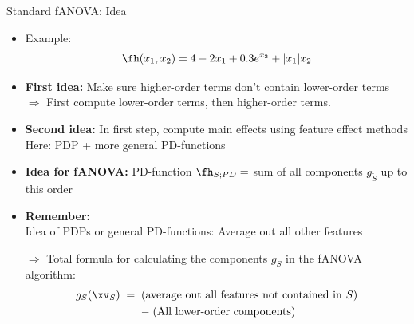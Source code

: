 \documentclass[11pt,compress,t,notes=noshow, aspectratio=169, xcolor=table]{beamer}
\begin{document}
\begin{frame}{Standard fANOVA: Idea}

    \begin{itemize}
        \item Example:
        \begin{equation*}
            \fh(x_1, x_2) = 4 - 2x_1 + 0.3 e^{x_2} + |x_1|x_2
        \end{equation*}
        \pause
        \item \textbf{First idea:} Make sure higher-order terms don't contain lower-order terms \\
        \(\Rightarrow\) First compute lower-order terms, then higher-order terms. \\
        \pause
        \item \textbf{Second idea:} In first step, compute main effects using feature effect methods \\
        Here: PDP + more general PD-functions
        \pause
        \item \textbf{Idea for fANOVA:} PD-function $\fh_{S;PD} =$ sum of all components $g_{\tilde{S}}$ up to this order
        \pause
        \item \textbf{Remember:} \\ Idea of PDPs or general PD-functions: Average out all other features
        \item[$\Rightarrow$] Total formula for calculating the components \(g_S\) in the fANOVA algorithm:
        \begin{multline*}
            g_{S} (\xv_S)
            \;=\; (\text{average out all features not contained in } S) \\
            \;-\; (\text{All lower-order components})
        \end{multline*}
    \end{itemize}

    
    
\end{frame}
\end{document}
